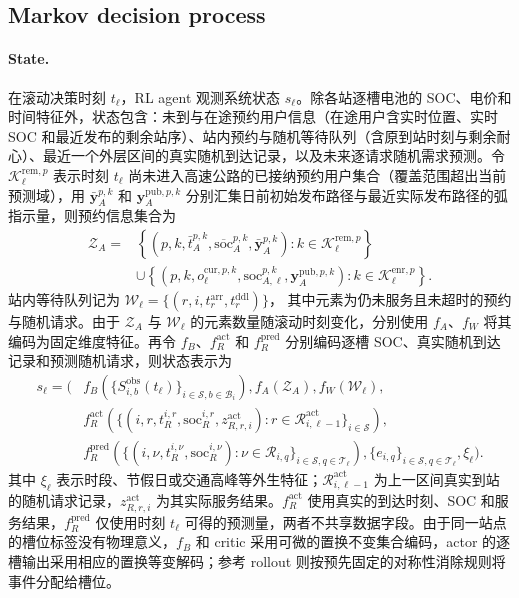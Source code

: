 \documentclass[12pt,a4paper,UTF8]{ctexart}
\begin{document}
\subsection{Markov decision process}

\paragraph{State.}
在滚动决策时刻 $t_\ell$，RL agent 观测系统状态 $s_\ell$。除各站逐槽电池的 SOC、电价和时间特征外，状态包含：未到与在途预约用户信息（在途用户含实时位置、实时 SOC 和最近发布的剩余站序）、站内预约与随机等待队列（含原到站时刻与剩余耐心）、最近一个外层区间的真实随机到达记录，以及未来逐请求随机需求预测。令
$\mathcal K_\ell^{\mathrm{rem},p}$ 表示时刻 $t_\ell$ 尚未进入高速公路的已接纳预约用户集合（覆盖范围超出当前预测域），用 $\bar{\mathbf y}_A^{p,k}$ 和 $\mathbf y_A^{\mathrm{pub},p,k}$ 分别汇集日前初始发布路径与最近实际发布路径的弧指示量，则预约信息集合为
\begin{equation}
\begin{aligned}
\mathcal Z_{A}
={}&
\left\{
\left(p,k,\bar t_A^{p,k},
\overline{\mathrm{soc}}_A^{p,k},
\bar{\mathbf y}_A^{p,k}\right):
k\in\mathcal K_\ell^{\mathrm{rem},p}
\right\}\\
&\cup
\left\{
\left(p,k,o_\ell^{\mathrm{cur},p,k},\mathrm{soc}_{A,\ell}^{p,k},
\mathbf y_A^{\mathrm{pub},p,k}\right):
k\in\mathcal K_\ell^{\mathrm{enr},p}
\right\}.
\end{aligned}
\label{eq:rl_reservation_information}
\end{equation}
站内等待队列记为
$\mathcal W_\ell=\{(r,i,t_r^{\mathrm{arr}},t_r^{\mathrm{ddl}})\}$，
其中元素为仍未服务且未超时的预约与随机请求。由于 $\mathcal Z_{A}$ 与 $\mathcal W_\ell$ 的元素数量随滚动时刻变化，分别使用 $f_A$、$f_W$ 将其编码为固定维度特征。再令 $f_B$、$f_R^{\mathrm{act}}$ 和 $f_R^{\mathrm{pred}}$ 分别编码逐槽 SOC、真实随机到达记录和预测随机请求，则状态表示为
\begin{equation}
\begin{aligned}
s_\ell=\Big(&
f_B\!\left(\{S_{i,b}^{\mathrm{obs}}(t_\ell)\}_{i\in\mathcal S,b\in\mathcal B_i}\right),
f_A(\mathcal Z_{A}),
f_W(\mathcal W_\ell),\\
&
f_R^{\mathrm{act}}\!\left(
\{(i,r,t_R^{i,r},\mathrm{soc}_R^{i,r},z_{R,r,i}^{\mathrm{act}}):
r\in\mathcal R_{i,\ell-1}^{\mathrm{act}}\}_{i\in\mathcal S}
\right),\\
&
f_R^{\mathrm{pred}}\!\left(
\{(i,\nu,t_{R}^{i,\nu},\mathrm{soc}_{R}^{i,\nu}):
\nu\in\mathcal R_{i,q}\}_{i\in\mathcal S,q\in\mathcal T_\ell}
\right),
\{e_{i,q}\}_{i\in\mathcal S,q\in\mathcal T_\ell},
\xi_\ell
\Big).
\end{aligned}
\label{eq:rl_state}
\end{equation}
其中 $\xi_\ell$ 表示时段、节假日或交通高峰等外生特征；$\mathcal R_{i,\ell-1}^{\mathrm{act}}$ 为上一区间真实到站的随机请求记录，$z_{R,r,i}^{\mathrm{act}}$ 为其实际服务结果。$f_R^{\mathrm{act}}$ 使用真实的到达时刻、SOC 和服务结果，$f_R^{\mathrm{pred}}$ 仅使用时刻 $t_\ell$ 可得的预测量，两者不共享数据字段。由于同一站点的槽位标签没有物理意义，$f_B$ 和 critic 采用可微的置换不变集合编码，actor 的逐槽输出采用相应的置换等变解码；参考 rollout 则按预先固定的对称性消除规则将事件分配给槽位。
\end{document}
